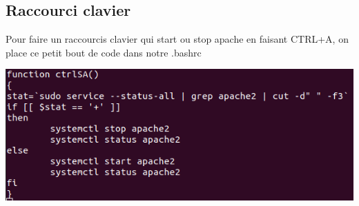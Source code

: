 \documentclass{article}
\begin{document}
  \subsection{\large{Raccourci clavier}}
  
  Pour faire un raccourcis clavier qui start ou stop apache en faisant CTRL+A, on place ce petit bout de code dans notre .bashrc
  
   \begin{center}
        \includegraphics[scale=0.6]{Images/CTRLA.png}
    \end{center}
 
 
\end{document}
